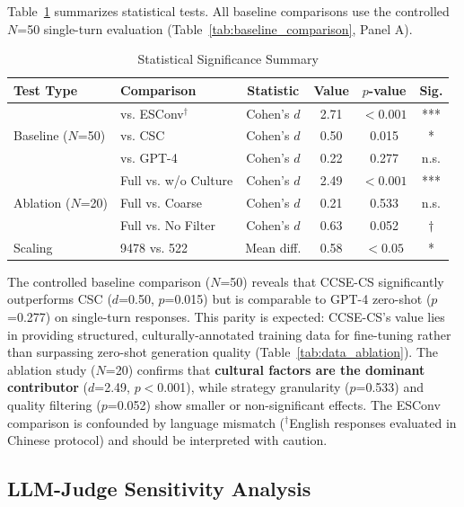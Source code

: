 \documentclass[11pt]{article}
\begin{document}
Table~\ref{tab:statistical_summary} summarizes statistical tests. All baseline comparisons use the controlled $N$=50 single-turn evaluation (Table~\ref{tab:baseline_comparison}, Panel A).

\begin{table}[t]
\centering
\caption{Statistical Significance Summary}
\label{tab:statistical_summary}
\begin{tabular}{llcccc}
\toprule
\textbf{Test Type} & \textbf{Comparison} & \textbf{Statistic} & \textbf{Value} & \textbf{$p$-value} & \textbf{Sig.} \\
\midrule
\multirow{3}{*}{Baseline ($N$=50)} & vs. ESConv$^{\dagger}$ & Cohen's $d$ & 2.71 & $<0.001$ & *** \\
 & vs. CSC & Cohen's $d$ & 0.50 & 0.015 & * \\
 & vs. GPT-4 & Cohen's $d$ & 0.22 & 0.277 & n.s. \\
\midrule
\multirow{3}{*}{Ablation ($N$=20)} & Full vs. w/o Culture & Cohen's $d$ & 2.49 & $<0.001$ & *** \\
 & Full vs. Coarse & Cohen's $d$ & 0.21 & 0.533 & n.s. \\
 & Full vs. No Filter & Cohen's $d$ & 0.63 & 0.052 & $\dagger$ \\
\midrule
Scaling & 9478 vs. 522 & Mean diff. & 0.58 & $<0.05$ & * \\
\bottomrule
\end{tabular}
\end{table}

The controlled baseline comparison ($N$=50) reveals that CCSE-CS significantly outperforms CSC ($d$=0.50, $p$=0.015) but is comparable to GPT-4 zero-shot ($p$=0.277) on single-turn responses. This parity is expected: CCSE-CS's value lies in providing structured, culturally-annotated training data for fine-tuning rather than surpassing zero-shot generation quality (Table~\ref{tab:data_ablation}). The ablation study ($N$=20) confirms that \textbf{cultural factors are the dominant contributor} ($d$=2.49, $p<$0.001), while strategy granularity ($p$=0.533) and quality filtering ($p$=0.052) show smaller or non-significant effects. The ESConv comparison is confounded by language mismatch ($^{\dagger}$English responses evaluated in Chinese protocol) and should be interpreted with caution.

\subsection{LLM-Judge Sensitivity Analysis}
\end{document}
